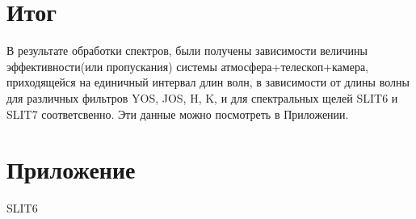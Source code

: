 \documentclass[a4paper]{article}
\begin{document}
\section{Итог}
В результате обработки спектров, были получены зависимости величины эффективности(или пропускания) системы атмосфера+телескоп+камера, приходящейся на единичный интервал длин волн, в зависимости от длины волны для различных фильтров YOS, JOS, H, K, и для спектральных щелей SLIT6 и SLIT7 соответсвенно. Эти данные можно посмотреть в Приложении.
\newpage

\section{Приложение}
SLIT6
\begin{figure}[h]
\end{figure}

\begin{figure}[h]
\end{figure}
\end{document}

